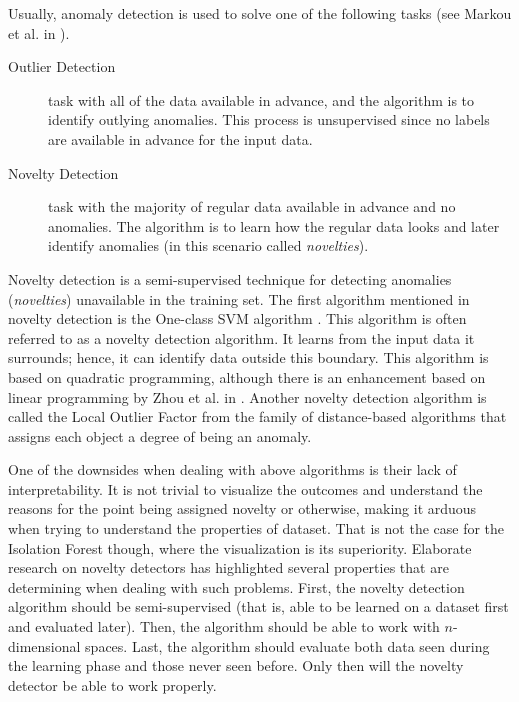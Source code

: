 
Usually, anomaly detection is used to solve one of the following tasks (see Markou et al. in \cite{MARKOU20032481}).
\begin{description}
    \item[Outlier Detection]  task with all of the data available in advance, and the algorithm is to identify outlying anomalies. This process is unsupervised since no labels are available in advance for the input data.
    \item[Novelty Detection]  task with the majority of regular data available in advance and no anomalies. The algorithm is to learn how the regular data looks and later identify anomalies (in this scenario called \emph{novelties}).
\end{description}

Novelty detection is a semi-supervised technique for detecting anomalies (\emph{novelties}) unavailable in the training set.
The first algorithm mentioned in novelty detection is the One-class SVM algorithm \cite{tax2004support}. This algorithm is often referred to as a novelty detection algorithm. It learns from the input data it surrounds; hence, it can identify data outside this boundary.
This algorithm is based on quadratic programming, although there is an enhancement based on linear programming by Zhou et al. in \cite{ZHOU20022927}.
Another novelty detection algorithm is called the Local Outlier Factor from the family of distance-based algorithms \cite{breunig2000lof} that assigns each object a degree of being an anomaly.



One of the downsides when dealing with above algorithms is their lack of interpretability. It is not trivial to visualize the outcomes and understand the reasons for the point being assigned novelty or otherwise, making it arduous when trying to understand the properties of dataset. That is not the case for the Isolation Forest though, where the visualization is its superiority.
Elaborate research on novelty detectors has highlighted several properties that are determining when dealing with such problems. First, the novelty detection algorithm should be semi-supervised (that is, able to be learned on a dataset first and evaluated later). Then, the algorithm should be able to work with \(n\)-dimensional spaces. Last, the algorithm should evaluate both data seen during the learning phase and those never seen before. Only then will the novelty detector be able to work properly. 

